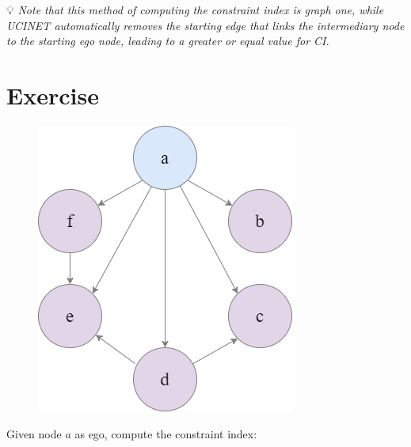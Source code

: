 \documentclass[
  notitlepage,
  onecolumn,
  openany]{book}
\begin{document}
💡 \emph{Note that this method of computing the constraint index is graph one, while UCINET automatically removes the starting edge that links the intermediary node to the starting ego node, leading to a greater or equal value for CI.}

\hypertarget{exercise}{%
\section{Exercise}\label{exercise}}

\begin{figure}[h!]

{\centering \includegraphics[width=0.35\linewidth]{images/08-Metrics for structural holes/08-constraint_index_example} 

}

\end{figure}

Given node \(a\) as ego, compute the constraint index:
\end{document}
